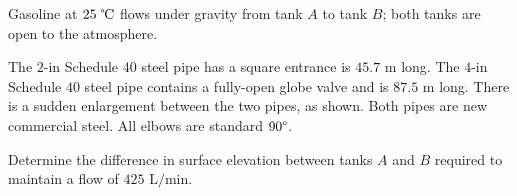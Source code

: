 \documentclass[10pt]{amsart}
\begin{document}
Gasoline at $25\text{ \textcelsius}$ flows under gravity from tank $A$ to tank $B$; both tanks are open to the
atmosphere.

The $2$-in Schedule $40$ steel pipe has a square entrance is $45.7\text{	m}$ long. The $4$-in Schedule $40$ steel
pipe contains a fully-open globe valve and is $87.5\text{ m}$ long. There is a sudden enlargement between the two
pipes, as shown. Both pipes are new commercial steel. All elbows are standard $90\degree$.

Determine the difference in surface elevation between tanks $A$
and $B$ required to maintain a flow of $425\text{ L/min}$.


\begin{multicols}{2}



	\vfill\columnbreak


\end{multicols}
\end{document}
